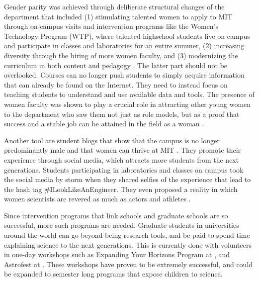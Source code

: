 \documentclass[utf8]{frontiersSCNS} %
\begin{document}
Gender parity was achieved through deliberate structural changes of the department that included (1) stimulating talented women to apply to MIT through on-campus visits and intervention programs like the Women's Technology Program (WTP), where talented highschool students live on campus and participate in classes and laboratories for an entire summer, (2) increasing diversity through the hiring of more women faculty, and (3) modernizing the curriculum in both content and pedagogy \citep{GenderDiversityMIT, xugetting}. The latter part should not be overlooked. Courses can no longer push students to simply acquire information that can already be found on the Internet. They need to instead focus on teaching students to understand and use available data and tools. The presence of women faculty was shown to play a crucial role in attracting other young women to the department who saw them not just as role models, but as a proof that success and a stable job can be attained in the field as a woman \citep{xugetting}. 

Another tool are student blogs that show that the campus is no longer predominantly male and that women can thrive at MIT \citep{xugetting}. They promote their experience through social media, which attracts more students from the next generations. Students participating in laboratories and classes on campus took the social media by storm when they shared selfies of the experience that lead to the hash tag \#ILookLikeAnEngineer.  They even proposed a reality in which women scientists are revered as much as actors and athletes \citep{GenderDiversityMIT}. 

Since intervention programs that link schools and graduate schools are so successful, more such programs are needed. Graduate students in universities around the world can go beyond being research tools, and be paid to spend time explaining science to the next generations. This is currently done with volunteers in one-day workshops such as Expanding Your Horizons Program at \cite{EYH}, and Astrofest at \cite{AstroFest}. These workshops have proven to be extremely successful, and could be expanded to semester long programs that expose children to science.
\end{document}
